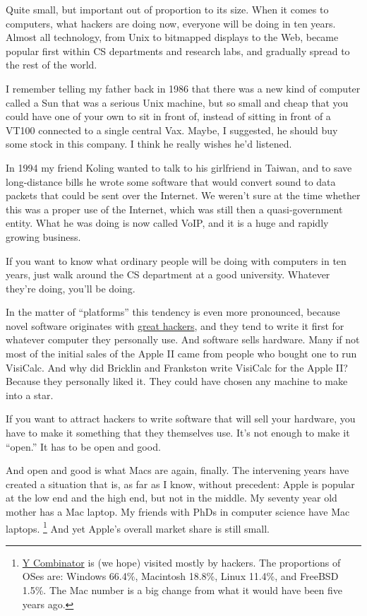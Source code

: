\documentclass[12pt]{book}
\begin{document}
Quite small, but important out of proportion to its size. When it comes
to computers, what hackers are doing now, everyone will be doing in ten
years. Almost all technology, from Unix to bitmapped displays to the
Web, became popular first within CS departments and research labs, and
gradually spread to the rest of the world.

I remember telling my father back in 1986 that there was a new kind of
computer called a Sun that was a serious Unix machine, but so small and
cheap that you could have one of your own to sit in front of, instead of
sitting in front of a VT100 connected to a single central Vax. Maybe, I
suggested, he should buy some stock in this company. I think he really
wishes he'd listened.

In 1994 my friend Koling wanted to talk to his girlfriend in Taiwan, and
to save long-distance bills he wrote some software that would convert
sound to data packets that could be sent over the Internet. We weren't
sure at the time whether this was a proper use of the Internet, which
was still then a quasi-government entity. What he was doing is now
called VoIP, and it is a huge and rapidly growing business.

If you want to know what ordinary people will be doing with computers in
ten years, just walk around the CS department at a good university.
Whatever they're doing, you'll be doing.

In the matter of ``platforms'' this tendency is even more pronounced,
because novel software originates with \href{gh.html}{great hackers},
and they tend to write it first for whatever computer they personally
use. And software sells hardware. Many if not most of the initial sales
of the Apple II came from people who bought one to run VisiCalc. And why
did Bricklin and Frankston write VisiCalc for the Apple II? Because they
personally liked it. They could have chosen any machine to make into a
star.

If you want to attract hackers to write software that will sell your
hardware, you have to make it something that they themselves use. It's
not enough to make it ``open.'' It has to be open and good.

And open and good is what Macs are again, finally. The intervening years
have created a situation that is, as far as I know, without precedent:
Apple is popular at the low end and the high end, but not in the middle.
My seventy year old mother has a Mac laptop. My friends with PhDs in
computer science have Mac laptops. \footnote{\href{http://ycombinator.com}{Y Combinator} is (we hope) visited
mostly by hackers. The proportions of OSes are: Windows 66.4\%,
Macintosh 18.8\%, Linux 11.4\%, and FreeBSD 1.5\%. The Mac number is a
big change from what it would have been five years ago.} And yet Apple's overall
market share is still small.
\end{document}
